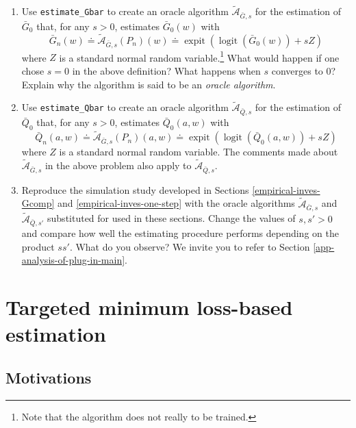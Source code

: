 \documentclass[11pt,openright,twoside]{book}
\DeclareMathOperator{\expit}{expit}
\DeclareMathOperator{\logit}{logit}
\newcommand{\Algora}{\widetilde{\mathcal{A}}}
\newcommand{\defq}{\doteq}
\newcommand{\Gbar}{\bar{G}}
\newcommand{\Qbar}{\bar{Q}}
\theoremstyle{definition}
\theoremstyle{definition}
\theoremstyle{definition}
\theoremstyle{remark}
\begin{document}
\begin{enumerate}
\def\labelenumi{\arabic{enumi}.}
\item
  Use \texttt{estimate\_Gbar} to create an oracle algorithm \(\Algora_{\Gbar,s}\) for
  the estimation of \(\Gbar_{0}\) that, for any \(s > 0\), estimates
  \(\Gbar_{0}(w)\) with \begin{equation*}    \Gbar_{n}(w)   \defq
  \Algora_{\Gbar,s}                     (P_{n})(w)                    \defq
  \expit\left(\logit\left(\Gbar_{0}(w)\right) +  s Z\right) \end{equation*}
  where \(Z\) is a standard normal random variable.\footnote{Note that the algorithm
    does not really to be trained.} What would happen if one chose \(s=0\) in the
  above definition? What happens when \(s\) converges to 0? Explain why the algorithm
  is said to be an \emph{oracle algorithm}.
\item
  Use \texttt{estimate\_Qbar} to create an oracle algorithm \(\Algora_{\Qbar,s}\) for
  the estimation of \(\Qbar_{0}\) that, for any \(s > 0\), estimates
  \(\Qbar_{0}(a,w)\) with \begin{equation*}    \Qbar_{n}(a,w)   \defq
  \Algora_{\Gbar,s}                     (P_{n})(a,w)                    \defq 
  \expit\left(\logit\left(\Qbar_{0}(a,w)\right) +  s Z\right) \end{equation*}
  where \(Z\) is a standard normal random variable. The comments made about
  \(\Algora_{\Gbar,s}\) in the above problem also apply to \(\Algora_{\Qbar,s}\).
\item
  Reproduce the simulation study developed in Sections \ref{empirical-inves-Gcomp}
  and \ref{empirical-inves-one-step} with the oracle algorithms \(\Algora_{\Gbar,s}\)
  and \(\Algora_{\Qbar,s'}\) substituted for used in these sections. Change the values
  of \(s,s' > 0\) and compare how well the estimating procedure performs depending on the product \(ss'\).
  What do you observe? We invite you to refer to Section \ref{app-analysis-of-plug-in-main}.
\end{enumerate}

\hypertarget{TMLE}{%
\chapter{Targeted minimum loss-based estimation}\label{TMLE}}

\hypertarget{TMLE-motivations}{%
\section{Motivations}\label{TMLE-motivations}}
\end{document}
